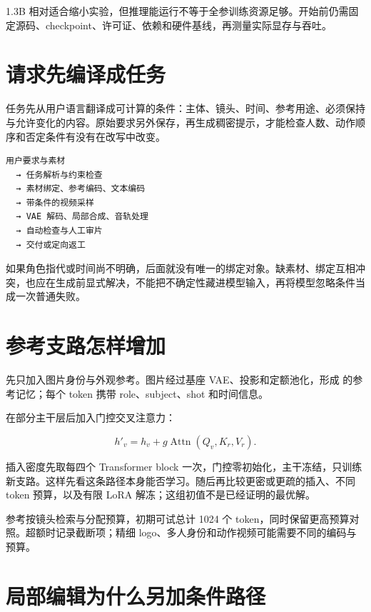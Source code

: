 1.3B 相对适合缩小实验，但推理能运行不等于全参训练资源足够。开始前仍需固定源码、checkpoint、许可证、依赖和硬件基线，再测量实际显存与吞吐。

\section{请求先编译成任务}\label{seedance-m12-ux8bf7ux6c42ux5148ux7f16ux8bd1ux6210ux4efbux52a1}

任务先从用户语言翻译成可计算的条件：主体、镜头、时间、参考用途、必须保持与允许变化的内容。原始要求另外保存，再生成稠密提示，才能检查人数、动作顺序和否定条件有没有在改写中改变。

\begin{verbatim}
用户要求与素材
  → 任务解析与约束检查
  → 素材绑定、参考编码、文本编码
  → 带条件的视频采样
  → VAE 解码、局部合成、音轨处理
  → 自动检查与人工审片
  → 交付或定向返工
\end{verbatim}

如果角色指代或时间尚不明确，后面就没有唯一的绑定对象。缺素材、绑定互相冲突，也应在生成前显式解决，不能把不确定性藏进模型输入，再将模型忽略条件当成一次普通失败。

\section{参考支路怎样增加}\label{seedance-m12-ux53c2ux8003ux652fux8defux600eux6837ux589eux52a0}

先只加入图片身份与外观参考。图片经过基座 VAE、投影和定额池化，形成  的参考记忆；每个 token 携带 role、subject、shot 和时间信息。

在部分主干层后加入门控交叉注意力：

\[
h'_v=h_v+g\operatorname{Attn}(Q_v,K_r,V_r).
\]

插入密度先取每四个 Transformer block 一次，门控零初始化，主干冻结，只训练新支路。这样先看这条路径本身能否学习。随后再比较更密或更疏的插入、不同 token 预算，以及有限 LoRA 解冻；这组初值不是已经证明的最优解。

参考按镜头检索与分配预算，初期可试总计 1024 个 token，同时保留更高预算对照。超额时记录截断项；精细 logo、多人身份和动作视频可能需要不同的编码与预算。

\section{局部编辑为什么另加条件路径}\label{seedance-m12-ux5c40ux90e8ux7f16ux8f91ux4e3aux4ec0ux4e48ux53e6ux52a0ux6761ux4ef6ux8defux5f84}

